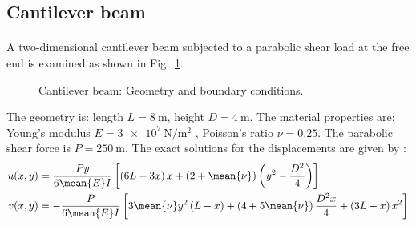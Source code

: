 \subsection{Cantilever beam}
\paragraph{}
A two-dimensional cantilever beam subjected to a parabolic shear load at the free end is examined as shown in Fig.~\ref{iso_fig:cantilever_beam_geo_bc}.
    \begin{figure}[h!]
    \centering
        \caption{ Cantilever beam: Geometry and boundary conditions.}
        \label{iso_fig:cantilever_beam_geo_bc}
    \end{figure}
%
The geometry is: length $ L = \SI{8}{\meter} $, height $ D = \SI{4}{\meter} $.
The material properties are: Young’s modulus $ E = \SI{3e7}{\newton \per \square \meter}$ , Poisson’s ratio $ \nu = 0.25 $.
The parabolic shear force is $P = \SI{250}{\meter} $.
The exact solutions for the displacements are given by \citep{Aug2008}:
    \begin{equation}
        \begin{aligned}
            u(x,y) &= 
                \frac{Py}{6 \mean{E} I}
                \left[
                    \left(
                        6L-3x
                    \right)x
                    +\left(
                        2+ \mean{\nu}
                    \right)\left(
                        y^2-\frac{D^2}{4}
                    \right)
                \right]
            \\
            v(x,y) &=  
                -\frac{P}{6 \mean{E} I}
                \left[
                    3 \mean{\nu} y^2 \left(
                        L-x
                    \right)+
                    \left(
                        4+5 \mean{\nu}
                    \right)\frac{D^2x}{4}+
                    \left(
                        3L-x
                    \right)x^2
                \right]        
        \end{aligned}
    \label{iso_eq:cantilever_beam_displacement_solution}
    \end{equation}
